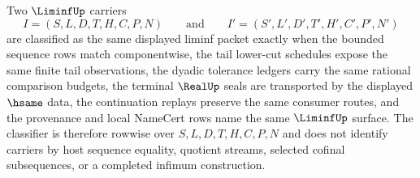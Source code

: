 \begin{definition}
\label{def:liminf-classifier}
Two $\LiminfUp$ carriers
$$
I=(S,L,D,T,H,C,P,N)
\qquad\text{and}\qquad
I'=(S',L',D',T',H',C',P',N')
$$
are classified as the same displayed liminf packet exactly when the bounded sequence rows match componentwise, the tail lower-cut schedules expose the same finite tail observations, the dyadic tolerance ledgers carry the same rational comparison budgets, the terminal $\RealUp$ seals are transported by the displayed $\hsame$ data, the continuation replays preserve the same consumer routes, and the provenance and local NameCert rows name the same $\LiminfUp$ surface. The classifier is therefore rowwise over $S,L,D,T,H,C,P,N$ and does not identify carriers by host sequence equality, quotient streams, selected cofinal subsequences, or a completed infimum construction.
\end{definition}

